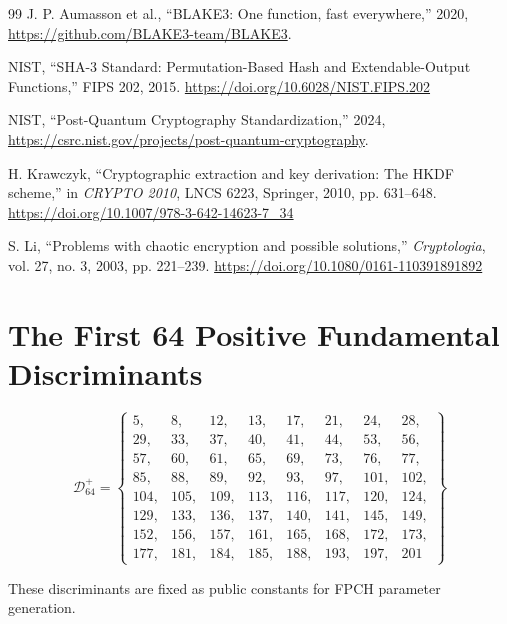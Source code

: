 \documentclass[11pt,a4paper]{article}
\theoremstyle{plain}
\theoremstyle{definition}
\theoremstyle{remark}
\begin{document}
\begin{thebibliography}{99}
J. P. Aumasson et al., ``BLAKE3: One function, fast everywhere,'' 2020, \url{https://github.com/BLAKE3-team/BLAKE3}.

NIST, ``SHA-3 Standard: Permutation-Based Hash and Extendable-Output Functions,'' FIPS 202, 2015. \url{https://doi.org/10.6028/NIST.FIPS.202}

NIST, ``Post-Quantum Cryptography Standardization,'' 2024, \url{https://csrc.nist.gov/projects/post-quantum-cryptography}.

H. Krawczyk, ``Cryptographic extraction and key derivation: The HKDF scheme,'' in \textit{CRYPTO 2010}, LNCS 6223, Springer, 2010, pp. 631--648. \url{https://doi.org/10.1007/978-3-642-14623-7_34}

S. Li, ``Problems with chaotic encryption and possible solutions,'' \textit{Cryptologia}, vol. 27, no. 3, 2003, pp. 221--239. \url{https://doi.org/10.1080/0161-110391891892}

\end{thebibliography}

\appendix
\section{The First 64 Positive Fundamental Discriminants}

\begin{equation}
\mathcal{D}^+_{64} = \left\{ \begin{array}{llllllll}
5, & 8, & 12, & 13, & 17, & 21, & 24, & 28, \\
29, & 33, & 37, & 40, & 41, & 44, & 53, & 56, \\
57, & 60, & 61, & 65, & 69, & 73, & 76, & 77, \\
85, & 88, & 89, & 92, & 93, & 97, & 101, & 102, \\
104, & 105, & 109, & 113, & 116, & 117, & 120, & 124, \\
129, & 133, & 136, & 137, & 140, & 141, & 145, & 149, \\
152, & 156, & 157, & 161, & 165, & 168, & 172, & 173, \\
177, & 181, & 184, & 185, & 188, & 193, & 197, & 201
\end{array} \right\}
\end{equation}

These discriminants are fixed as public constants for FPCH parameter generation.
\end{document}
